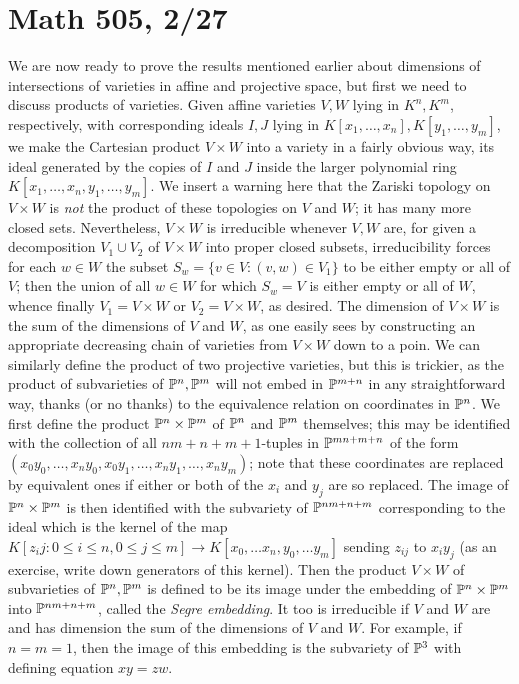\documentclass[10pt]{article}
\begin{document}
\section*{Math 505, 2/27}

We are now ready to prove the results mentioned earlier about dimensions
of intersections of varieties in affine and projective space, but first
we need to discuss products of varieties. Given affine varieties $V,W$
lying in $K^n,K^m$, respectively, with corresponding ideals $I,J$ lying
in $K[x_1,\ldots,x_n],K[y_1,\ldots,y_m]$, we make the Cartesian product
$V\times W$ into a variety in a fairly obvious way, its ideal generated
by the copies of $I$ and $J$ inside the larger polynomial ring
$K[x_1,\ldots,x_n,y_1,\ldots,y_m]$. We insert a warning here that the
Zariski topology on $V\times W$ is {\sl not} the product of these
topologies on $V$ and $W$; it has many more closed sets. Nevertheless,
$V\times W$ is irreducible whenever $V,W$ are, for given a decomposition
$V_1\cup V_2$ of $V\times W$ into proper closed subsets, irreducibility
forces for each $w\in W$ the subset $S_w = \{v\in V: (v,w)\in V_1\}$ to
be either empty or all of $V$; then the union of all $w\in W$ for which
$S_w = V$ is either empty or all of $W$, whence finally $V_1 = V\times
W$ or $V_2 = V\times W$, as desired. The dimension of $V\times W$ is the
sum of the dimensions of $V$ and $W$, as one easily sees by constructing
an appropriate decreasing chain of varieties from $V\times W$ down to a
poin. We can similarly define the product of two projective varieties,
but this is trickier, as the product of subvarieties of $\Bbb P^n,\Bbb
P^m$ will not embed in $\Bbb P^{m+n}$ in any straightforward way, thanks
(or no thanks) to the equivalence relation on coordinates in $\Bbb P^n$.
We first define the product $\Bbb P^n\times\Bbb P^m$ of $\Bbb P^n$ and
$\Bbb P^m$ themselves; this may be identified with the collection of all
$nm+n+m+1$-tuples in $\Bbb P^{mn+m+n}$ of the form
$(x_0y_0,\ldots,x_ny_0,x_0y_1,\ldots,x_ny_1,\ldots,x_ny_m)$; note that
these coordinates are replaced by equivalent ones if either or both of
the $x_i$ and $y_j$ are so replaced. The image of $\Bbb P^n\times \Bbb
P^m$ is then identified with the subvariety of $\Bbb P^{nm+n+m}$
corresponding to the ideal which is the kernel of the map $K[z_ij:0\le
  i\le n,0\le j\le m]\rightarrow K[x_0,\ldots x_n,y_0,\ldots y_m]$
sending $z_{ij}$ to $x_i y_j$ (as an exercise, write down generators of
this kernel). Then the product $V\times W$ of subvarieties of $\Bbb
P^n,\Bbb P^m$ is defined to be its image under the embedding of $\Bbb
P^n\times \Bbb P^m$ into $\Bbb P^{nm+n+m}$, called the {\sl Segre
  embedding}. It too is irreducible if $V$ and $W$ are and has dimension
the sum of the dimensions of $V$ and $W$. For example, if $n=m=1$, then
the image of this embedding is the subvariety of $\Bbb P^3$ with
defining equation $xy = zw$.
\end{document}
